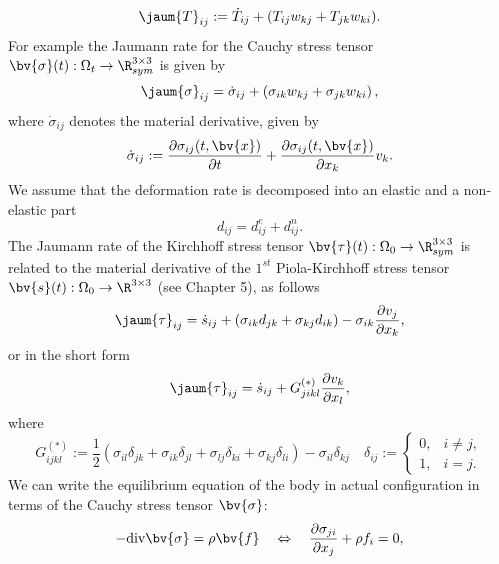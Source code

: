 \begin{equation}\label{eq:JaumannDerivativeDefinition}
\jaum{T}_{ij}:=\dot{T}_{ij}+(T_{ij}w_{kj}+T_{jk}w_{ki}).
\end{equation}
For example the Jaumann rate for the Cauchy stress tensor $\bv{\sigma}(t):\Omega_t\rightarrow \R^{3\times 3}_{sym}$ is given by
\begin{equation}
\jaum{\sigma}_{ij}=\dot{\sigma}_{ij}+\left(\sigma_{ik}w_{kj}+\sigma_{jk}w_{ki}\right),
\end{equation}
where $\dot{\sigma}_{ij}$ denotes the  material derivative, given by
\begin{equation}
\dot{\sigma}_{ij}:=\frac{\partial \sigma_{ij}(t,\bv{x})}{ \partial t}+\frac{\partial \sigma_{ij}(t,\bv{x})}{ \partial x_k} v_k.
\end{equation}
We assume that the deformation rate is decomposed into an elastic and a non-elastic part
\begin{equation}
d_{ij}=d^{e}_{ij}+d^{n}_{ij}.
\end{equation}
The Jaumann rate of the Kirchhoff stress tensor $\bv{\tau}(t):\Omega_0\rightarrow \R^{3\times 3}_{sym}$ is related to the material derivative of the $1^{st}$ Piola-Kirchhoff stress tensor $\bv{s}(t):\Omega_0\rightarrow \R^{3\times 3}$ (see \cite{Belytschko2000} Chapter 5), as follows
\begin{equation}
\jaum{\tau}_{ij}=\dot{s}_{ij}+(\sigma_{ik}d_{jk}+\sigma_{kj}d_{ik})-\sigma_{ik}\frac{\partial v_j}{\partial x_k}, 
\end{equation}
or in the short form
\begin{equation}
\jaum{\tau}_{ij}=\dot{s}_{ij} +G^{(*)}_{jikl} \frac{\partial v_k}{\partial x_l},
\end{equation}
where 
\begin{equation}
G^{(*)}_{ijkl}:=\dfrac{1}{2}\left(\sigma_{il}\delta_{jk}+\sigma_{ik}\delta_{jl}+\sigma_{lj}\delta_{ki}+\sigma_{kj}\delta_{li}\right)-\sigma_{il}\delta_{kj}\quad  \delta_{ij}:=\left\{
\begin{array}{cc}
0, & i \neq j, \\
1, & i = j.
\end{array}\right.
\end{equation}
We can write the equilibrium equation of the body in actual configuration in  terms of the  Cauchy stress tensor $\bv{\sigma}$:
\begin{equation}\label{eq:EquilibriumEquationCauchy}
-\text{div}\bv{\sigma}=\rho \bv{f} \quad \Leftrightarrow \quad  \frac{\partial \sigma_{ji}}{\partial x_j}  +\rho f_i=0,
\end{equation}
